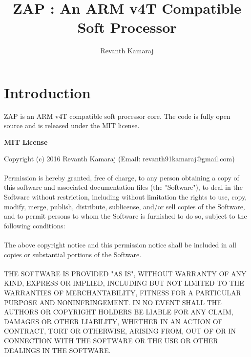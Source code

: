 \documentclass[11pt]{article}
\begin{document}
\title{ ZAP : An ARM v4T Compatible Soft Processor }
\author{Revanth Kamaraj}

\begin{titlepage}
\clearpage\maketitle
\thispagestyle{empty}
\maketitle
\end{titlepage}


\section{Introduction}

ZAP is an ARM{\textregistered} v4T compatible soft processor core. The code is
fully open source and is released under the MIT license.

\begin{center}
\textbf{MIT License} \\
\end{center}
Copyright (c) 2016 Revanth Kamaraj (Email: revanth91kamaraj@gmail.com) \\\\
Permission is hereby granted, free of charge, to any person obtaining a copy
of this software and associated documentation files (the "Software"), to deal
in the Software without restriction, including without limitation the rights
to use, copy, modify, merge, publish, distribute, sublicense, and/or sell
copies of the Software, and to permit persons to whom the Software is
furnished to do so, subject to the following conditions: \\\\
The above copyright notice and this permission notice shall be included in all
copies or substantial portions of the Software. \\\\
THE SOFTWARE IS PROVIDED "AS IS", WITHOUT WARRANTY OF ANY KIND, EXPRESS OR
IMPLIED, INCLUDING BUT NOT LIMITED TO THE WARRANTIES OF MERCHANTABILITY,
FITNESS FOR A PARTICULAR PURPOSE AND NONINFRINGEMENT. IN NO EVENT SHALL THE
AUTHORS OR COPYRIGHT HOLDERS BE LIABLE FOR ANY CLAIM, DAMAGES OR OTHER
LIABILITY, WHETHER IN AN ACTION OF CONTRACT, TORT OR OTHERWISE, ARISING FROM,
OUT OF OR IN CONNECTION WITH THE SOFTWARE OR THE USE OR OTHER DEALINGS IN THE
SOFTWARE.
\end{document}
